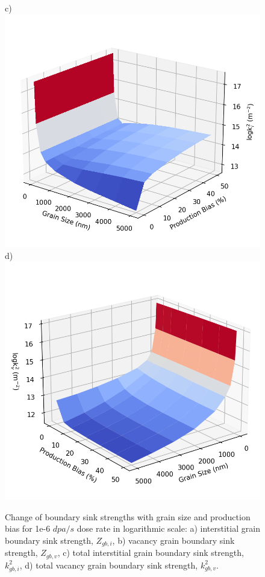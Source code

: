 \documentclass[utf8]{frontiersSCNS} %
\begin{document}
\begin{figure}[h!]
        c)\includegraphics[scale=0.55]{Fig12_c}
        d)\includegraphics[scale=0.55]{Fig12_d}
        \caption{Change of boundary sink strengths with grain size and production bias for 1e-6 $dpa/s$ dose rate in logarithmic scale: a) interstitial grain boundary sink strength, $Z_{gb,i}$, b) vacancy grain boundary sink strength, $Z_{gb,v}$, c) total interstitial grain boundary sink strength, $k_{gb,i}^2$, d) total vacancy grain boundary sink strength, $k_{gb,v}^2$.}
        \label{figure:sink_strength_moose_neutron_3D}
     \end{figure}
\end{document}
